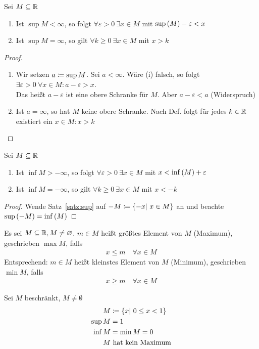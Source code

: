 \begin{satz}
    \label{satz:sup}
    Sei $M\subseteq \mathbb{R}$
    \begin{enumerate}[label=(\roman*)]
        \item Ist $\sup M < \infty$, so folgt $\forall \varepsilon > 0~\exists x\in M$ mit $\sup\left(M\right) -\varepsilon < x$
        \item Ist $\sup M = \infty$, so gilt $\forall k\geq 0~\exists x\in M$ mit $x> k$
    \end{enumerate}
    \begin{proof}
        \theoremescape
        \begin{enumerate}[label=(\roman*)]
            \item Wir setzen $a\coloneqq \sup M$. Sei $a<\infty$. Wäre (i) falsch, so folgt $\exists \varepsilon>0~\forall x\in M\colon a-\varepsilon > x$.\\Das heißt $a-\varepsilon$ ist eine obere Schranke für $M$. Aber $a-\varepsilon < a$ (Widerspruch)
            \item Ist $a=\infty$, so hat $M$ keine obere Schranke. Nach Def. folgt für jedes $k\in\mathbb{R}$ existiert ein $x\in M\colon x > k$\qedhere
        \end{enumerate}
    \end{proof}
\end{satz}
\begin{satz}
    \label{satz:inf}
    Sei $M\subseteq \mathbb{R}$
    \begin{enumerate}[label=(\roman*)]
        \item Ist $\inf M > -\infty$, so folgt $\forall \varepsilon > 0~\exists x\in M$ mit $x < \inf\left(M\right)+ \varepsilon$
        \item Ist $\inf M = -\infty$, so gilt $\forall k\geq 0~\exists x\in M$ mit $x< -k$
    \end{enumerate}
    \begin{proof}
        Wende Satz~\ref{satz:sup} auf $-M\coloneqq\left\{-x|~x\in M\right\}$ an und beachte $\sup\left(-M\right) = \inf\left(M\right)$
    \end{proof}
\end{satz}
\begin{definition}
    Es sei $M\subseteq \mathbb{R}, M\neq\varnothing$. $m\in M$ heißt größtes Element von $M$ (Maximum), geschrieben $\max M$, falls
    \begin{align*}
        x\leq m\quad\forall x\in M
    \end{align*}
    Entsprechend: $m\in M$ heißt kleinstes Element von $M$ (Minimum), geschrieben $\min M$, falls
    \begin{align*}
        x\geq m\quad\forall x\in M
    \end{align*}
\end{definition}

\begin{beispiel}
    Sei $M$ beschränkt, $M\neq\emptyset$
    \begin{align*}
        M&\coloneqq\left\{x|~0\leq x< 1\right\}\\
        \sup M &= 1\\
        \inf M &= \min M = 0\\
        M&\text{ hat kein Maximum}
    \end{align*}
\end{beispiel}

\newpage